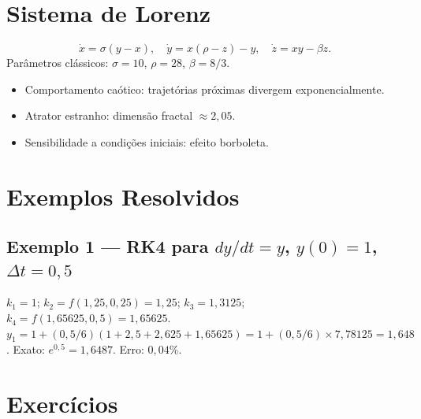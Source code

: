 \documentclass[12pt,a4paper]{article}
\begin{document}
\section*{Sistema de Lorenz}

\[
\dot x = \sigma(y-x), \quad \dot y = x(\rho-z)-y, \quad \dot z = xy-\beta z.
\]
Par\^ametros cl\'assicos: $\sigma=10$, $\rho=28$, $\beta=8/3$.
\begin{itemize}
  \item Comportamento ca\'otico: trajet\'orias pr\'oximas divergem exponencialmente.
  \item Atrator estranho: dimens\~ao fractal $\approx 2{,}05$.
  \item Sensibilidade a condi\c{c}\~oes iniciais: efeito borboleta.
\end{itemize}

\section*{Exemplos Resolvidos}

\subsection*{Exemplo 1 --- RK4 para $dy/dt = y$, $y(0)=1$, $\Delta t=0{,}5$}
$k_1 = 1$; $k_2 = f(1{,}25, 0{,}25) = 1{,}25$; $k_3 = 1{,}3125$; $k_4 = f(1{,}65625, 0{,}5) = 1{,}65625$.
$y_1 = 1 + (0{,}5/6)(1 + 2{,}5 + 2{,}625 + 1{,}65625) = 1 + (0{,}5/6)\times7{,}78125 = 1{,}648$.
Exato: $e^{0{,}5} = 1{,}6487$. Erro: $0{,}04\%$.

\section*{Exerc\'icios}
\end{document}
